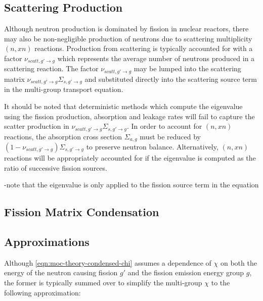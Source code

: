 \subsection{Scattering Production}
\label{sec:chap2-scatt-prod}

Although neutron production is dominated by fission in nuclear reactors, there may also be non-negligible production of neutrons due to scattering multiplicity $(n,xn)$ reactions. Production from scattering is typically accounted for with a factor $\nu_{scatt,g' \rightarrow g}$ which represents the average number of neutrons produced in a scattering reaction. The factor $\nu_{scatt,g' \rightarrow g}$ may be lumped into the scattering matrix $\nu_{scatt,g' \rightarrow g}\Sigma_{s,g' \rightarrow g}$ and substituted directly into the scattering source term in the multi-group transport equation. 

It should be noted that deterministic methods which compute the eigenvalue using the fission production, absorption and leakage rates will fail to capture the scatter production in $\nu_{scatt,g' \rightarrow g}\Sigma_{s,g' \rightarrow g}$.
In order to account for $(n,xn)$ reactions, the absorption cross section $\Sigma_{a,g}$ must be reduced by $(1-\nu_{scatt,g' \rightarrow g})\Sigma_{s,g' \rightarrow g}$ to preserve neutron balance. Alternatively, $(n,xn)$ reactions will be appropriately accounted for if the eigenvalue is computed as the ratio of successive fission sources.

-note that the eigenvalue is only applied to the fission source term in the equation\\


\subsection{Fission Matrix Condensation}
\label{sec:chap2-fiss-mat}


\subsection{Approximations}
\label{subsec:chap2-approx}

Although \autoref{eqn:moc-theory-condensed-chi} assumes a dependence of $\chi$ on both the energy of the neutron causing fission $g'$ and the fission emission energy group $g$, the former is typically summed over to simplify the multi-group $\chi$ to the following approximation:

